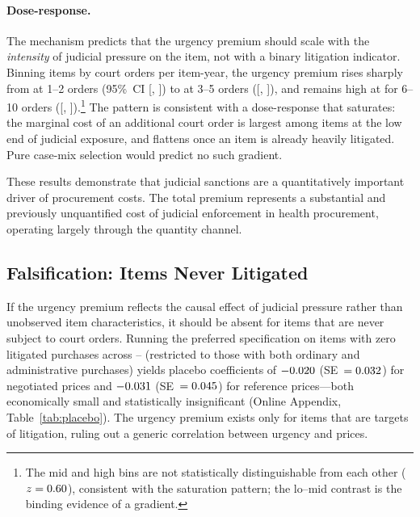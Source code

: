\paragraph{Dose-response.} The mechanism predicts that the urgency premium should scale with the \emph{intensity} of judicial pressure on the item, not with a binary litigation indicator. Binning items by court orders per item-year, the urgency premium rises sharply from \BPdoseLow{} at 1--2 orders (95\%~CI [\BPdoseLowCIlo, \BPdoseLowCIhi]) to \BPdoseMid{} at 3--5 orders ([\BPdoseMidCIlo, \BPdoseMidCIhi]), and remains high at \BPdoseHigh{} for 6--10 orders ([\BPdoseHighCIlo, \BPdoseHighCIhi]).\footnote{The mid and high bins are not statistically distinguishable from each other ($z = 0.60$), consistent with the saturation pattern; the lo--mid contrast is the binding evidence of a gradient.} The pattern is consistent with a dose-response that saturates: the marginal cost of an additional court order is largest among items at the low end of judicial exposure, and flattens once an item is already heavily litigated. Pure case-mix selection would predict no such gradient.

These results demonstrate that judicial sanctions are a quantitatively important driver of procurement costs. The \BPutgPctRange{} total premium represents a substantial and previously unquantified cost of judicial enforcement in health procurement, operating largely through the quantity channel.

\subsection{Falsification: Items Never Litigated}
\label{sec:placebo}

If the urgency premium reflects the causal effect of judicial pressure
rather than unobserved item characteristics, it should be absent for
items that are never subject to court orders. Running the preferred
specification on items with zero litigated purchases across
\BPsampleStartYear--\BPsampleEndYear{}
(restricted to those with both ordinary and administrative purchases)
yields placebo coefficients of $-0.020$ (SE~$= 0.032$) for negotiated
prices and $-0.031$ (SE~$= 0.045$) for reference prices---both
economically small and statistically insignificant (Online Appendix,
Table~\ref{tab:placebo}). The urgency premium exists only for items
that are targets of litigation, ruling out a generic correlation
between urgency and prices.

